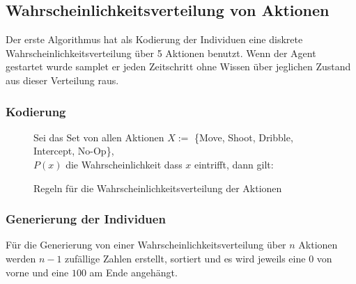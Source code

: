 \newpage

        \subsection{Wahrscheinlichkeitsverteilung von Aktionen}

            Der erste Algorithmus hat als Kodierung der Individuen eine diskrete Wahrscheinlichkeitsverteilung über 5 Aktionen benutzt. Wenn der Agent gestartet wurde samplet er jeden Zeitschritt ohne Wissen über jeglichen Zustand aus dieser Verteilung raus. 

            \subsubsection*{Kodierung}

            \begin{figure}[H]
                \begin{mdframed}
                    Sei das Set von allen Aktionen $ X := $ \{Move, Shoot, Dribble, Intercept, No-Op\}, \\
                    $P(x)$ die Wahrscheinlichkeit dass $x$ eintrifft, dann gilt: \\[2mm]
                    \hspace*{25mm} 
                \end{mdframed}
                \renewcommand{\figurename}{Lemma}
                \caption{\label{kodierung} Regeln für die Wahrscheinlichkeitsverteilung der Aktionen}
            \end{figure}


            \subsubsection*{Generierung der Individuen}
            Für die Generierung von einer Wahrscheinlichkeitsverteilung über $n$ Aktionen werden $n-1$ zufällige Zahlen erstellt, sortiert und es wird jeweils eine $0$ von vorne und eine $100$ am Ende angehängt.

